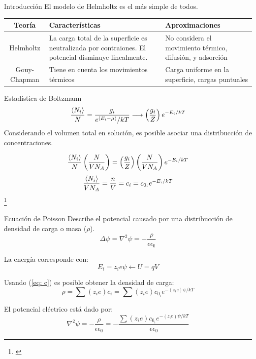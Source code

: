 \documentclass[handout]{beamer}
\newcommand\blfootnote[1]
{%
	\begingroup
	\renewcommand\thefootnote{}\footnote{#1}%
	\addtocounter{footnote}{-1}%
	\endgroup
}
\newcommand{\fcite}[1]{\blfootnote{\cite{#1}}}
\begin{document}
\begin{frame}{Introducci\'on}
	El modelo de Helmholtz es el m\'as simple de todos.
	\begin{table}[h]
		\small
		\begin{tabular}{c|p{3cm}p{3cm}}
			\textbf{Teor\'ia} & \textbf{Caracter\'isticas} & \textbf{Aproximaciones} \\
			\hline
			Helmholtz & La carga total de la superficie es neutralizada por contraiones. El potencial disminuye linealmente. & No considera el movimiento t\'ermico, difusi\'on, y adsorci\'on \\
			\hline
			Gouy-Chapman & Tiene en cuenta los movimientos t\'ermicos & Carga uniforme en la superficie, cargas puntuales \\
			\hline
		\end{tabular}
	\end{table}
\end{frame}

\begin{frame}{Estad\'istica de Boltzmann}
	\begin{equation}
		\dfrac{\braket{N_i}}{N} = \dfrac{g_i}{e^{(E_i - \mu)}/kT} \longrightarrow \left(\dfrac{g_i}{Z}\right)e^{-E_i/kT}
	\end{equation}
	Considerando el volumen total en soluci\'on, es posible asociar una distribucci\'on de concentraciones.
	
	\begin{equation}
		\dfrac{\braket{N_i}}{N}\left(\dfrac{N}{VN_A}\right) = \left(\dfrac{g_i}{Z}\right)\left(\dfrac{N}{VN_A}\right)e^{-E_i/kT}
	\end{equation}
	\begin{equation}\label{eq: c}
		\dfrac{\braket{N_i}}{VN_A} = \dfrac{n}{V} = c_i = c_{0_i}e^{-E_i/kT}
	\end{equation}
	\fcite{butt2006physics}
\end{frame}

\begin{frame}{Ecuaci\'on de Poisson}
	Describe el potencial causado por una distribucci\'on de densidad de carga o masa ($\rho$).
	\begin{equation}
		\Delta \psi = \nabla^2 \psi = -\dfrac{\rho}{\epsilon\epsilon_0}
	\end{equation}
	
	La energ\'ia corresponde con:
	\begin{equation}
		E_i = z_ie\psi \longleftarrow U = qV
	\end{equation}
	
	Usando (\ref{eq: c}) es posible obtener la densidad de carga:
	\begin{equation}
		\rho = \sum (z_ie)c_i = \sum (z_ie) c_{0_i}e^{-(z_ie)\psi/kT}
	\end{equation}
	
	El potencial el\'ectrico est\'a dado por:
	\begin{equation}
		\nabla^2 \psi = -\dfrac{\rho}{\epsilon\epsilon_0} = -\dfrac{\sum (z_ie) c_{0_i}e^{-(z_ie)\psi/kT}}{\epsilon\epsilon_0}
	\end{equation}
\end{frame}
\end{document}
